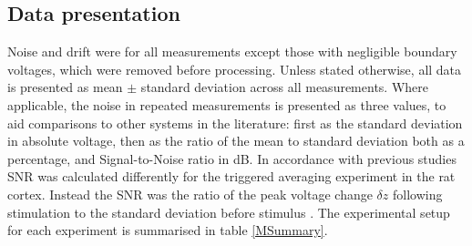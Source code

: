 \subsection{Data presentation}

Noise and drift were for all measurements except those with negligible boundary voltages, which were removed before processing. Unless stated otherwise, all data is presented as mean $\pm$ standard deviation across all measurements. Where applicable, the noise in repeated measurements is presented as three values, to aid comparisons to other systems in the literature: first as the standard deviation in absolute voltage, then as the ratio of the mean to standard deviation both as a percentage, and Signal-to-Noise ratio in dB. In accordance with previous studies SNR was calculated differently for the triggered averaging experiment in the rat cortex. Instead the SNR was the ratio of the peak voltage change $\delta z$ following stimulation to the standard deviation before stimulus \cite{Oh2011}. The experimental setup for each experiment is summarised in table \ref{MSummary}.
